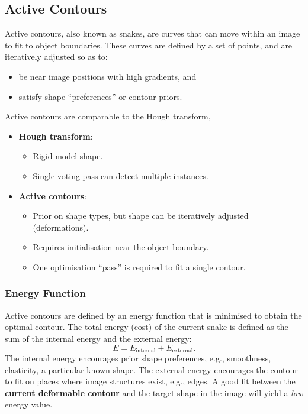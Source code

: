 \documentclass{article}
\begin{document}
\subsection{Active Contours}
Active contours, also known as snakes, are curves that can move within
an image to fit to object boundaries. These curves are defined by a set
of points, and are iteratively adjusted so as to:
\begin{itemize}
    \item be near image positions with high gradients, and
    \item satisfy shape ``preferences'' or contour priors.
\end{itemize}
Active contours are comparable to the Hough transform,
\begin{itemize}
    \item \textbf{Hough transform}:
          \begin{itemize}
              \item Rigid model shape.
              \item Single voting pass can detect multiple instances.
          \end{itemize}
    \item \textbf{Active contours}:
          \begin{itemize}
              \item Prior on shape types, but shape can be iteratively
                    adjusted (deformations).
              \item Requires initialisation near the object boundary.
              \item One optimisation ``pass'' is required to fit a
                    single contour.
          \end{itemize}
\end{itemize}
\subsubsection{Energy Function}
Active contours are defined by an energy function that is minimised to
obtain the optimal contour. The total energy (cost) of the current
snake is defined as the sum of the internal energy and the external
energy:
\begin{equation*}
    E = E_{\text{internal}} + E_{\text{external}}.
\end{equation*}
The internal energy encourages prior shape preferences, e.g., smoothness,
elasticity, a particular known shape. The external energy encourages
the contour to fit on places where image structures exist, e.g., edges.
A good fit between the \textbf{current deformable contour} and the
target shape in the image will yield a \textit{low} energy value.
\end{document}
